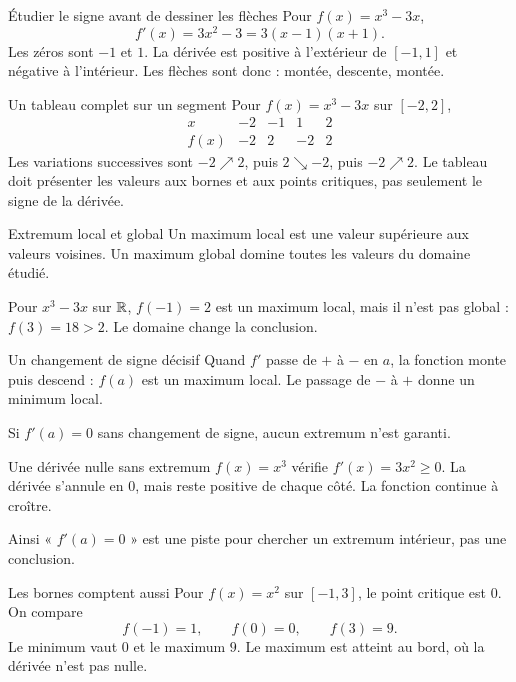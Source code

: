 \documentclass[aspectratio=169,12pt]{beamer}
\begin{document}
\renewcommand{\slidekind}{COMPRENDRE}
\begin{frame}[t,fragile]{Étudier le signe avant de dessiner les flèches}
Pour $f(x)=x^3-3x$,\[f\prime(x)=3x^2-3=3(x-1)(x+1).\] Les zéros sont $-1$ et $1$. La dérivée est positive à l’extérieur de $[-1,1]$ et négative à l’intérieur. Les flèches sont donc : montée, descente, montée.
\end{frame}
\renewcommand{\slidekind}{COMPRENDRE}
\begin{frame}[t,fragile]{Un tableau complet sur un segment}
Pour $f(x)=x^3-3x$ sur $[-2,2]$,\[\begin{array}{c|cccc}x&-2&-1&1&2\\\hline f(x)&-2&2&-2&2\end{array}\]\medskip Les variations successives sont $-2\nearrow2$, puis $2\searrow-2$, puis $-2\nearrow2$. Le tableau doit présenter les valeurs aux bornes et aux points critiques, pas seulement le signe de la dérivée.
\end{frame}
\renewcommand{\slidekind}{COMPRENDRE}
\begin{frame}[t,fragile]{Extremum local et global}
Un maximum local est une valeur supérieure aux valeurs voisines. Un maximum global domine toutes les valeurs du domaine étudié.\medskip\par Pour $x^3-3x$ sur $\mathbb{R}$, $f(-1)=2$ est un maximum local, mais il n’est pas global : $f(3)=18>2$. Le domaine change la conclusion.
\end{frame}
\renewcommand{\slidekind}{COMPRENDRE}
\begin{frame}[t,fragile]{Un changement de signe décisif}
Quand $f\prime$ passe de $+$ à $-$ en $a$, la fonction monte puis descend : $f(a)$ est un maximum local. Le passage de $-$ à $+$ donne un minimum local.\medskip\par Si $f\prime(a)=0$ sans changement de signe, aucun extremum n’est garanti.
\end{frame}
\renewcommand{\slidekind}{COMPRENDRE}
\begin{frame}[t,fragile]{Une dérivée nulle sans extremum}
$f(x)=x^3$ vérifie $f\prime(x)=3x^2\ge0$. La dérivée s’annule en $0$, mais reste positive de chaque côté. La fonction continue à croître.\medskip\par Ainsi « $f\prime(a)=0$ » est une piste pour chercher un extremum intérieur, pas une conclusion.
\end{frame}
\renewcommand{\slidekind}{COMPRENDRE}
\begin{frame}[t,fragile]{Les bornes comptent aussi}
Pour $f(x)=x^2$ sur $[-1,3]$, le point critique est $0$. On compare\[f(-1)=1,\qquad f(0)=0,\qquad f(3)=9.\] Le minimum vaut $0$ et le maximum $9$. Le maximum est atteint au bord, où la dérivée n’est pas nulle.
\end{frame}
\end{document}
